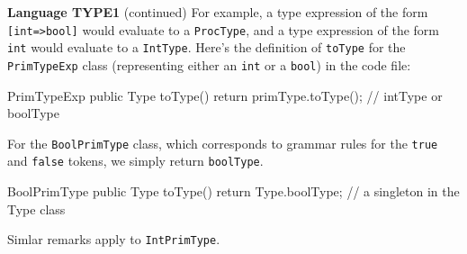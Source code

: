 \begin{minipage}[t]{\sw}
\slidenumber
\LARGE
{\bf Language TYPE1} (continued)\exx
\Large
For example, a type expression of the form \verb'[int=>bool]'
would evaluate to a \verb'ProcType',
and a type expression of the form \verb'int' would evaluate
to a \verb'IntType'.\exx
Here's the definition of \verb'toType' for the \verb'PrimTypeExp' class
(representing either an \verb'int' or a \verb'bool') in the code file:
\begin{qv}
PrimTypeExp
    public Type toType() {
        return primType.toType(); // intType or boolType
    }
\end{qv}
For the \verb'BoolPrimType' class,
which corresponds to grammar rules
for the \verb'true' and \verb'false' tokens,
we simply return \verb'boolType'.
\begin{qv}
BoolPrimType
    public Type toType() {
        return Type.boolType; // a singleton in the Type class
    }
\end{qv}
Simlar remarks apply to \verb'IntPrimType'.
\end{minipage}
